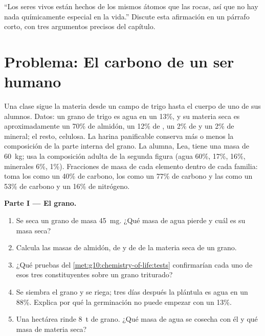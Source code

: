 \begin{exercise}[$\star\star\star$]\label{exo:g10:chemistry-of-life:15}
``Los seres vivos están hechos de los mismos átomos que las rocas, así
que no hay nada químicamente especial en la vida.'' Discute esta
afirmación en un párrafo corto, con tres argumentos precisos del
capítulo.
\end{exercise}

\section{Problema: El carbono de un ser humano}

\begin{problem}
\label{pb:g10:chemistry-of-life:1}
Una clase sigue la materia desde un campo de trigo hasta el cuerpo de
uno de sus alumnos. Datos: un grano de trigo es agua en un 13\%, y su
materia seca es aproximadamente un 70\% de almidón, un 12\% de
, un 2\% de  y un 2\% de mineral; el resto, celulosa. La
harina panificable conserva más o menos la composición de la parte
interna del grano. La alumna, Lea, tiene una masa de \qty{60}{kg}; usa
la composición adulta de la segunda figura (agua 60\%,  17\%,
 16\%, minerales 6\%,  1\%). Fracciones de masa de cada
elemento dentro de cada familia: toma los  como un 40\% de
carbono, los  como un 77\% de carbono y las  como un
53\% de carbono y un 16\% de nitrógeno.

\medskip
\noindent\textbf{Parte I --- El grano.}
\begin{enumerate}
  \item Se seca un grano de masa \qty{45}{mg}. ¿Qué masa de agua pierde
        y cuál es su masa seca?
  \item Calcula las masas de almidón, de  y de  de la
        materia seca de un grano.
  \item ¿Qué pruebas del \cref{met:g10:chemistry-of-life:tests}
        confirmarían cada uno de esos tres constituyentes sobre un
        grano triturado?
  \item Se siembra el grano y se riega; tres días después la plántula
        es agua en un 88\%. Explica por qué la germinación no puede
        empezar con un 13\%.
  \item Una hectárea rinde \qty{8}{t} de grano. ¿Qué masa de agua se
        cosecha con él y qué masa de materia seca?
\end{enumerate}


\end{problem}
